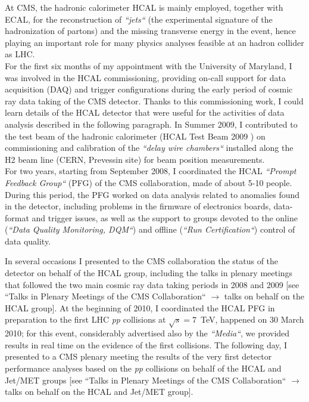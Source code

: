 \documentclass[10pt, a4paper]{article}
\begin{document}
At CMS, the hadronic calorimeter HCAL is mainly employed, together with ECAL, for the reconstruction 
of {\it ``jets``} (the experimental signature of the hadronization of partons) and the missing transverse energy
in the event, hence playing an important role for many physics analyses feasible at an hadron collider as LHC. \\

For the first six months of my appointment with the University of Maryland, I was involved in the 
HCAL commissioning, providing on-call support for data acquisition (DAQ) and trigger configurations 
during the early period of cosmic ray data taking of the CMS detector. Thanks to this commissioning work, 
I could learn details of the HCAL detector that were useful for the activities of data analysis described 
in the following paragraph. In Summer 2009, I contributed to the test beam of the hadronic calorimeter
(HCAL Test Beam 2009 \cite{Chatrchyan:2010zz}) on commissioning and calibration of the 
{\it ``delay wire chambers``} installed along the H2 beam line (CERN, Prevessin site) 
for beam position measurements. \\

For two years, starting from September 2008, I coordinated the 
HCAL {\it ``Prompt Feedback Group``} (PFG) of the CMS collaboration, 
made of about 5-10 people. During this period, the PFG worked 
on data analysis related to anomalies found in the detector, including 
problems in the firmware of electronics boards, data-format and trigger issues, 
as well as the support to groups devoted to the online ({\it ``Data Quality Monitoring, DQM``})
and offline ({\it ``Run Certification``}) control of data quality.

In several occasions I presented to the CMS collaboration the status of the detector on behalf of the HCAL group, 
including the talks in plenary meetings that followed the two main cosmic ray data taking periods in 2008 and 2009
[see ``Talks in Plenary Meetings of the CMS Collaboration`` $\rightarrow$ talks on behalf on the HCAL group].
At the beginning of 2010, I coordinated the HCAL PFG in preparation to the first LHC {\it pp} collisions at $\sqrt{s}=7$~TeV, 
happened on 30 March 2010; for this event, considerably advertised also by the {\it ``Media``}, we provided 
results in real time on the evidence of the first collisions. The following day, I presented to a CMS plenary meeting the results 
of the very first detector performance analyses based on the {\it pp} collisions on behalf of the HCAL and Jet/MET groups
[see ``Talks in Plenary Meetings of the CMS Collaboration`` $\rightarrow$ talks on behalf on the HCAL and Jet/MET group]. \\
\end{document}
